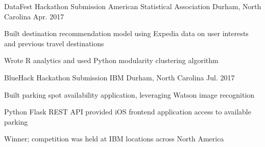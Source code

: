 \begin{cventries}
\cventry
	{DataFest Hackathon Submission} %
	{American Statistical Association} %
	{Durham, North Carolina} %
	{Apr. 2017} %
	{
		\begin{cvitems} %
			\item {Built destination recommendation model using Expedia data on user interests and previous travel destinations}
			\item {Wrote R analytics and used Python modularity clustering algorithm}
		\end{cvitems}
	}

\cventry
{BlueHack Hackathon Submission} %
{IBM} %
{Durham, North Carolina} %
{Jul. 2017} %
{
	\begin{cvitems} %
		\item {Built parking spot availability application, leveraging Watson image recognition}
		\item {Python Flask REST API provided iOS frontend application access to available parking}
		\item {Winner; competition was held at IBM locations across North America}
	\end{cvitems}
}




\end{cventries}